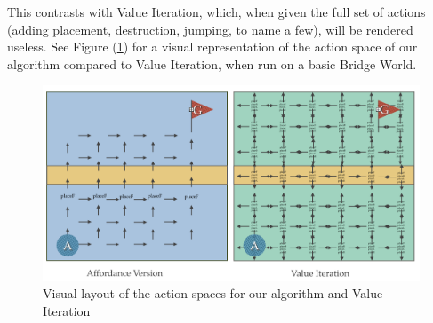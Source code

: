 \documentclass[a4paper]{article}
\begin{document}
This contrasts with Value Iteration, which, when given the full set of actions (adding placement, destruction, jumping, to name a few), will be rendered useless. See Figure (\ref{fig:action_space}) for a visual representation of the action space of our algorithm compared to Value Iteration, when run on a basic Bridge World.

\begin{figure}[h]
	\includegraphics[scale=0.2]{images/comparison.png}
	\caption{Visual layout of the action spaces for our algorithm and Value Iteration}
	\label{fig:action_space}
\end{figure}

\end{document}
